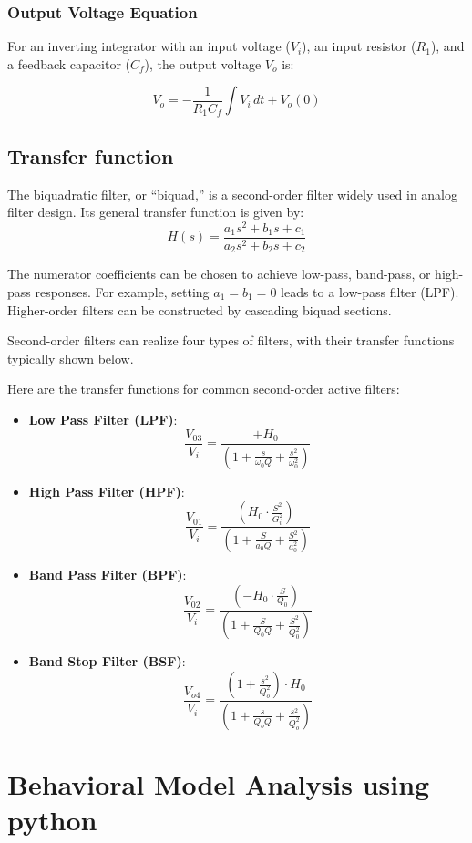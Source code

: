 \documentclass[
  letterpaper,
  DIV=11,
  numbers=noendperiod]{scrreprt}
\begin{document}
\subsection{Output Voltage Equation}\label{output-voltage-equation-1}

For an inverting integrator with an input voltage (\(V_i\)), an input
resistor (\(R_1\)), and a feedback capacitor (\(C_f\)), the output
voltage \(V_o\) is:

\[V_o = - \frac{1}{R_1 C_f} \int V_i \, dt + V_o(0)\]

\section{Transfer function}\label{transfer-function}

The biquadratic filter, or ``biquad,'' is a second-order filter widely
used in analog filter design. Its general transfer function is given by:
\[H(s)=\frac{a_{1}s^{2}+b_{1}s+c_{1}}{a_{2}s^{2}+b_{2}s+c_{2}}\]

The numerator coefficients can be chosen to achieve low-pass, band-pass,
or high-pass responses. For example, setting \(a_{1}=b_{1}=0\) leads to
a low-pass filter (LPF). Higher-order filters can be constructed by
cascading biquad sections.

Second-order filters can realize four types of filters, with their
transfer functions typically shown below.

Here are the transfer functions for common second-order active filters:

\begin{itemize}
\item
  \textbf{Low Pass Filter (LPF)}:
  \[\frac{V_{03}}{V_{i}}=\frac{+H_{0}}{(1+\frac{s}{\omega_{0}Q}+\frac{s^{2}}{\omega_{0}^{2}})}\]
\item
  \textbf{High Pass Filter (HPF)}:
  \[\frac{V_{01}}{V_{i}}=\frac{(H_{0}\cdot\frac{S^{2}}{G_{i}^{2}})}{(1+\frac{S}{a_{0}Q}+\frac{S^{2}}{a_{0}^{2}})}\]
\item
  \textbf{Band Pass Filter (BPF)}:
  \[\frac{V_{02}}{V_{i}}=\frac{(-H_{0}\cdot\frac{S}{Q_{0}})}{(1+\frac{S}{Q_{0}Q}+\frac{S^{2}}{Q_{0}^{2}})}\]
\item
  \textbf{Band Stop Filter (BSF)}:
  \[\frac{V_{o4}}{V_{i}}=\frac{(1+\frac{s^{2}}{Q_{o}^{2}})\cdot H_{0}}{(1+\frac{s}{Q_{o}Q}+\frac{s^{2}}{Q_{o}^{2}})}\]
\end{itemize}

\chapter{Behavioral Model Analysis using
python}\label{behavioral-model-analysis-using-python}
\end{document}

